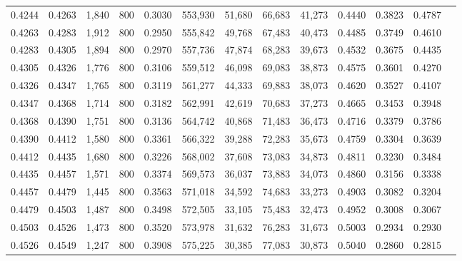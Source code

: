 \begin{tabular}{rrrrrrrrrrrrr}
0.4244 & 0.4263 &  1,840 &   800 &                                     0.3030 & 553,930 &  51,680 &  66,683 &  41,273 & 0.4440 & 0.3823 & 0.4787 \\
0.4263 & 0.4283 &  1,912 &   800 &                                     0.2950 & 555,842 &  49,768 &  67,483 &  40,473 & 0.4485 & 0.3749 & 0.4610 \\
0.4283 & 0.4305 &  1,894 &   800 &                                     0.2970 & 557,736 &  47,874 &  68,283 &  39,673 & 0.4532 & 0.3675 & 0.4435 \\
0.4305 & 0.4326 &  1,776 &   800 &                                     0.3106 & 559,512 &  46,098 &  69,083 &  38,873 & 0.4575 & 0.3601 & 0.4270 \\
0.4326 & 0.4347 &  1,765 &   800 &                                     0.3119 & 561,277 &  44,333 &  69,883 &  38,073 & 0.4620 & 0.3527 & 0.4107 \\
0.4347 & 0.4368 &  1,714 &   800 &                                     0.3182 & 562,991 &  42,619 &  70,683 &  37,273 & 0.4665 & 0.3453 & 0.3948 \\
0.4368 & 0.4390 &  1,751 &   800 &                                     0.3136 & 564,742 &  40,868 &  71,483 &  36,473 & 0.4716 & 0.3379 & 0.3786 \\
0.4390 & 0.4412 &  1,580 &   800 &                                     0.3361 & 566,322 &  39,288 &  72,283 &  35,673 & 0.4759 & 0.3304 & 0.3639 \\
0.4412 & 0.4435 &  1,680 &   800 &                                     0.3226 & 568,002 &  37,608 &  73,083 &  34,873 & 0.4811 & 0.3230 & 0.3484 \\
0.4435 & 0.4457 &  1,571 &   800 &                                     0.3374 & 569,573 &  36,037 &  73,883 &  34,073 & 0.4860 & 0.3156 & 0.3338 \\
0.4457 & 0.4479 &  1,445 &   800 &                                     0.3563 & 571,018 &  34,592 &  74,683 &  33,273 & 0.4903 & 0.3082 & 0.3204 \\
0.4479 & 0.4503 &  1,487 &   800 &                                     0.3498 & 572,505 &  33,105 &  75,483 &  32,473 & 0.4952 & 0.3008 & 0.3067 \\
0.4503 & 0.4526 &  1,473 &   800 &                                     0.3520 & 573,978 &  31,632 &  76,283 &  31,673 & 0.5003 & 0.2934 & 0.2930 \\
0.4526 & 0.4549 &  1,247 &   800 &                                     0.3908 & 575,225 &  30,385 &  77,083 &  30,873 & 0.5040 & 0.2860 & 0.2815 \\

\end{tabular}
